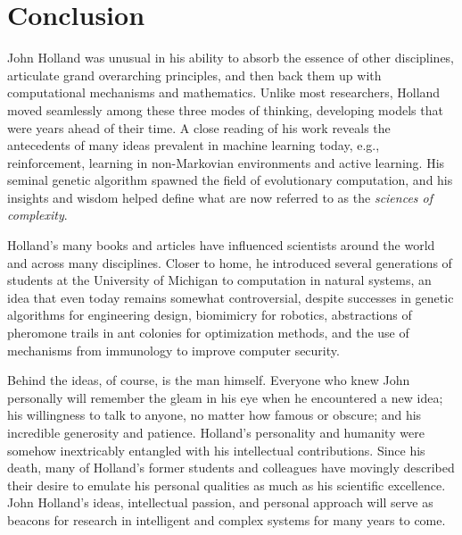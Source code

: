 \documentclass{sig-alternate}
\begin{document}


\section{Conclusion}

John Holland was unusual in his ability to absorb the essence of other
disciplines, articulate grand overarching
principles, and then back them up with computational mechanisms and
mathematics.  Unlike most researchers, Holland moved seamlessly among these
three modes of thinking, developing models that were years ahead of their time.  A
close reading of his work reveals the antecedents of many ideas prevalent in
machine learning today, e.g., reinforcement, learning in non-Markovian
environments and active learning.   His seminal genetic algorithm
spawned the field of evolutionary computation, and his insights
and wisdom helped define what are now referred to as the
\emph{sciences of complexity}.   

Holland's many books and articles have influenced scientists around
the world and across many disciplines.  Closer to home, he introduced
several generations of students at the University of Michigan to
computation in natural systems, an idea that even today remains
somewhat controversial, despite successes in genetic algorithms for
engineering design, biomimicry for robotics, abstractions of pheromone
trails in ant colonies for optimization methods, and the use of
mechanisms from immunology to improve computer security.

Behind the ideas, of course, is the man himself.   Everyone who knew
John personally will remember the gleam in his eye when he
encountered a new idea; his willingness to talk to anyone, no matter
how famous or obscure; and his incredible generosity and patience.
Holland's personality and humanity were somehow inextricably entangled
with his intellectual contributions.  Since his death, many of
Holland's former students and colleagues have movingly described their
desire to emulate his personal qualities as much as his scientific
excellence.  John Holland's ideas, intellectual passion, and personal approach will serve as
beacons for research in intelligent and complex systems for many
years to come. 
\end{document}
